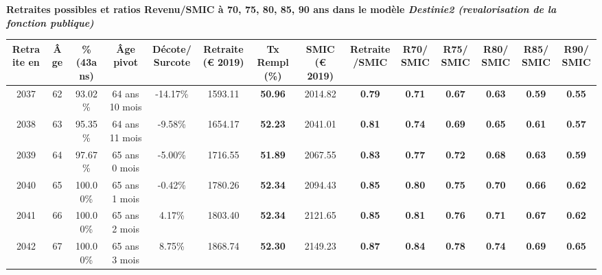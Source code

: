  \vspace{0.1cm} 
{\bf \noindent Retraites possibles et ratios Revenu/SMIC à 70, 75, 80, 85, 90 ans dans le modèle \emph{Destinie2 (revalorisation de la fonction publique)}}  
 
\begin{adjustbox}{max width=\textwidth} 
\begin{tabular}[htb]{|c|c||c|c|c||c|c||c|c||c|c|c|c|c|} 
\hline 
 Retraite en &  Âge &  \%(43ans) &  Âge pivot &  Décote/Surcote &  Retraite (\euro{} 2019) &  Tx Rempl(\%) &  SMIC (\euro{} 2019) &  Retraite/SMIC &  R70/SMIC &  R75/SMIC &  R80/SMIC &  R85/SMIC &  R90/SMIC \\ 
\hline \hline 
 2037 &  62 &  93.02\% &  64 ans 10 mois &  -14.17\% &  1593.11 &  {\bf 50.96} &  2014.82 &  {\bf {\color{red} 0.79}} &  {\bf {\color{red} 0.71}} &  {\bf {\color{red} 0.67}} &  {\bf {\color{red} 0.63}} &  {\bf {\color{red} 0.59}} &  {\bf {\color{red} 0.55}} \\ 
\hline 
 2038 &  63 &  95.35\% &  64 ans 11 mois &  -9.58\% &  1654.17 &  {\bf 52.23} &  2041.01 &  {\bf {\color{red} 0.81}} &  {\bf {\color{red} 0.74}} &  {\bf {\color{red} 0.69}} &  {\bf {\color{red} 0.65}} &  {\bf {\color{red} 0.61}} &  {\bf {\color{red} 0.57}} \\ 
\hline 
 2039 &  64 &  97.67\% &  65 ans 0 mois &  -5.00\% &  1716.55 &  {\bf 51.89} &  2067.55 &  {\bf {\color{red} 0.83}} &  {\bf {\color{red} 0.77}} &  {\bf {\color{red} 0.72}} &  {\bf {\color{red} 0.68}} &  {\bf {\color{red} 0.63}} &  {\bf {\color{red} 0.59}} \\ 
\hline 
 2040 &  65 &  100.00\% &  65 ans 1 mois &  -0.42\% &  1780.26 &  {\bf 52.34} &  2094.43 &  {\bf {\color{red} 0.85}} &  {\bf {\color{red} 0.80}} &  {\bf {\color{red} 0.75}} &  {\bf {\color{red} 0.70}} &  {\bf {\color{red} 0.66}} &  {\bf {\color{red} 0.62}} \\ 
\hline 
 2041 &  66 &  100.00\% &  65 ans 2 mois &  4.17\% &  1803.40 &  {\bf 52.34} &  2121.65 &  {\bf {\color{red} 0.85}} &  {\bf {\color{red} 0.81}} &  {\bf {\color{red} 0.76}} &  {\bf {\color{red} 0.71}} &  {\bf {\color{red} 0.67}} &  {\bf {\color{red} 0.62}} \\ 
\hline 
 2042 &  67 &  100.00\% &  65 ans 3 mois &  8.75\% &  1868.74 &  {\bf 52.30} &  2149.23 &  {\bf {\color{red} 0.87}} &  {\bf {\color{red} 0.84}} &  {\bf {\color{red} 0.78}} &  {\bf {\color{red} 0.74}} &  {\bf {\color{red} 0.69}} &  {\bf {\color{red} 0.65}} \\ 
\hline 
\hline 
\end{tabular} 
\end{adjustbox} 
 
